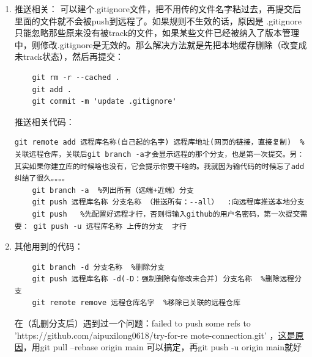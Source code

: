 \documentclass{article}
\begin{document}
\begin{enumerate}
\item 推送相关：
可以建个.gitignore文件，把不用传的文件名字粘过去，再提交后里面的文件就不会被push到远程了。如果规则不生效的话，原因是 .gitignore 只能忽略那些原来没有被track的文件，如果某些文件已经被纳入了版本管理中，则修改.gitignore是无效的。那么解决方法就是先把本地缓存删除（改变成未track状态），然后再提交：
\begin{lstlisting}
	git rm -r --cached .	
	git add .	
	git commit -m 'update .gitignore'
\end{lstlisting}
推送相关代码：
\begin{lstlisting}[breaklines=true]
	git remote add 远程库名称(自己起的名字) 远程库地址(网页的链接，直接复制)  %关联远程仓库，关联后git branch -a才会显示远程的那个分支，也是第一次提交。另：其实如果你建立库的时候啥也没有，它会提示你要干啥的。我就因为输代码的时候忘了add纠结了很久。。。。
	git branch -a  %列出所有（远端+近端）分支
	git push 远程库名称 分支名称 （推送所有：--all）  :向远程库推送本地分支
	git push   %先配置好远程才行，否则得输入github的用户名密码，第一次提交需要： git push -u 远程库名称 上传的分支  才行
\end{lstlisting}

\item 其他用到的代码：
\begin{lstlisting}
	git branch -d 分支名称  %删除分支
	git push 远程库名称 -d(-D：强制删除有修改未合并) 分支名称  %删除远程分支
	git remote remove 远程仓库名字  %移除已关联的远程仓库
\end{lstlisting}
在（乱删分支后）遇到过一个问题：failed to push some refs to 'https://github.com/aipuxilong0618/try-for-re
mote-connection.git' ，\href{https://www.cnblogs.com/Rainingday/p/12364690.html}{这是原因}，用git pull --rebase origin main
可以搞定，再git push -u origin main就好
\end{enumerate}
\end{document}
